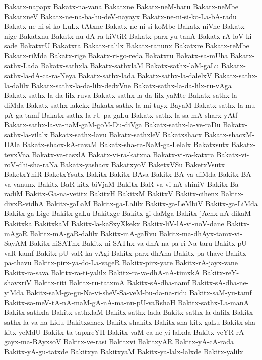 {Bakatx-napapx
Bakatx-na-vana
Bakatxne
Bakatx-neM-baru
Bakatx-neMbe
BakatxneV
Bakatx-ne-na-ba-hu-deV-nayayx
Bakatx-ne-ni-si-ko-La-bA-radu
Bakatx-ne-ni-si-ko-LuLx-tAtxne
Bakatx-ne-ni-si-koMbe
Bakatx-niVne
Bakatx-nige
Bakatxnu
Bakatx-nu-dA-ra-kiVtiR
Bakatx-parx-yu-tanA
Bakatx-rA-loV-ki-sade
BakatxrU
Bakatxra
Bakatx-ralilx
Bakatx-ranunx
Bakatxre
Bakatx-reMbe
Bakatx-riMda
Bakatx-rige
Bakatx-ri-go-reda
Bakatxru
Bakatx-sa-mUha
Bakatx-sathx-Lada
Bakatx-sathxla
Bakatx-sathxlaM
Bakatx-sathx-laM-gaLu
Bakatx-sathx-la-dA-ca-ra-Neya
Bakatx-sathx-lada
Bakatx-sathx-la-dalelxV
Bakatx-sathx-la-dalilx
Bakatx-sathx-la-da-lilx-dedxVne
Bakatx-sathx-la-da-lilx-ru-vAga
Bakatx-sathx-la-da-lilx-ruva
Bakatx-sathx-la-da-lilx-yaMte
Bakatx-sathx-la-diMda
Bakatx-sathx-lakekx
Bakatx-sathx-la-mi-tuyx-BayaM
Bakatx-sathx-la-mu-pA-ga-tamf
Bakatx-sathx-la-rU-pa-gaLu
Bakatx-sathx-la-sa-mA-sharx-yAtf
Bakatx-sathx-la-va-naM-gaM-goM-Du-diVga
Bakatx-sathx-la-ve-raDu
Bakatx-sathx-la-vilalx
Bakatx-sathx-lavu
Bakatx-sathxleV
Bakatxshacx
Bakatx-shacxM-DAla
Bakatx-shacx-kA-ravaM
Bakatx-sha-ra-NaM-ga-Lelalx
Bakatxsutx
Bakatx-tevxVna
Bakatx-va-tasxlA
Bakatx-vi-ra-katxna
Bakatx-vi-ra-katxra
Bakatx-vi-roV-dhi-sha-raNa
Bakatx-yashacx
BakatxyoV
BaketxVSu
BaketxVsutx
BaketxYhiR
BaketxYsutx
Bakitx
Bakitx-BAva
Bakitx-BA-va-diMda
Bakitx-BA-va-vanunx
Bakitx-BaR-kitx-biVjaM
Bakitx-BaR-va-vi-nA-shiniV
Bakitx-Ba-radiM
Bakitx-Ga-na-vetitx
BakitxH
BakitxM
BakitxV
Bakitx-cihenx
Bakitx-divxR-vidhA
Bakitx-gaLaM
Bakitx-ga-Lalilx
Bakitx-ga-LeMbiV
Bakitx-ga-LiMda
Bakitx-ga-Lige
Bakitx-gaLu
Bakitxge
Bakitx-gi-daMga
Bakitx-jAcnx-nA-dikaM
Bakitxka
BakitxkaM
Bakitx-la-kaSxyXkekx
Bakitx-liV-lA-vi-noV-dane
Bakitx-mAgaR
Bakitx-mA-gaR-dalilx
Bakitx-mA-gaRvu
Bakitx-ma-dhAyx-tamx-vi-SayAM
Bakitx-niSAThx
Bakitx-ni-SAThx-va-dhA-na-pa-ri-Na-taru
Bakitx-pU-vaR-kamf
Bakitx-pU-vaR-ka-vAgi
Bakitx-parx-dhAna
Bakitx-pa-thave
Bakitx-pa-thavu
Bakitx-pirx-ya-do-La-vageR
Bakitx-pirx-yare
Bakitx-rA-jayx-vane
Bakitx-ra-sava
Bakitx-ra-ti-yalilx
Bakitx-ra-va-dhA-nA-timxkA
Bakitx-reY-shavxriV
Bakitx-riti
Bakitx-ru-tatxmA
Bakitx-sA-dha-namf
Bakitx-sA-dha-ne-yiMda
Bakitx-saM-ga-gu-Na-vi-sheV-Sa-veM-bu-da-na-ridu
Bakitx-saM-yu-tamf
Bakitx-sa-meV-tA-nA-maM-gA-nA-ma-nu-pU-vaRshaH
Bakitx-sathx-La-manA
Bakitx-sathxla
Bakitx-sathxlaM
Bakitx-sathx-lada
Bakitx-sathx-la-dalilx
Bakitx-sathx-la-va-na-Lidu
Bakitxshacx
Bakitx-shakitx
Bakitx-sha-kitx-gaLu
Bakitx-sha-kitx-yeMdU
Bakitx-ta-tapxreYH
Bakitx-vaM-ca-ne-yi-lalxda
Bakitx-veYR-rA-gayx-ma-BAyxsoV
Bakitx-ve-rasi
Bakitxvi
BakitxyAR
Bakitx-yA-cA-rada
Bakitx-yA-gu-tatxde
Bakitxya
BakitxyaM
Bakitx-ya-lalx-lalxde
Bakitx-yalilx
}
